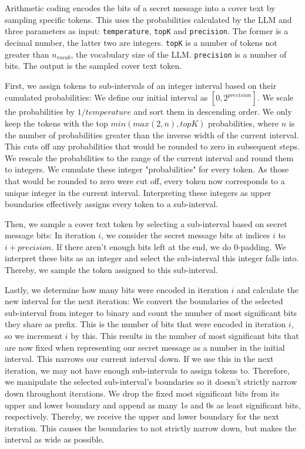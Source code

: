 Arithmetic coding encodes the bits of a secret message into a cover text by sampling specific tokens. This uses the probabilities calculated by the \gls{LLM} and three parameters as input: \lstinline|temperature|, \lstinline|topK| and \lstinline|precision|. The former is a decimal number, the latter two are integers. \lstinline|topK| is a number of tokens not greater than $ n_{vocab} $, the vocabulary size of the \gls{LLM}. \lstinline|precision| is a number of bits. The output is the sampled cover text token.

First, we assign tokens to sub-intervals of an integer interval based on their cumulated probabilities: We define our initial interval as $ [0, 2^{precision}] $. We scale the probabilities by $ 1/temperature $ and sort them in descending order. We only keep the tokens with the top $ min(max(2, n), topK) $ probabilities, where $ n $ is the number of probabilities greater than the inverse width of the current interval. This cuts off any probabilities that would be rounded to zero in subsequent steps. We rescale the probabilities to the range of the current interval and round them to integers. We cumulate these integer "probabilities" for every token. As those that would be rounded to zero were cut off, every token now corresponds to a unique integer in the current interval. Interpreting these integers as upper boundaries effectively assigns every token to a sub-interval.

Then, we sample a cover text token by selecting a sub-interval based on secret message bits: In iteration $ i $, we consider the secret message bits at indices $ i $ to $ i + precision $. If there aren't enough bits left at the end, we do 0-padding. We interpret these bits as an integer and select the sub-interval this integer falls into. Thereby, we sample the token assigned to this sub-interval.

Lastly, we determine how many bits were encoded in iteration $ i $ and calculate the new interval for the next iteration: We convert the boundaries of the selected sub-interval from integer to binary and count the number of most significant bits they share as prefix. This is the number of bits that were encoded in iteration $ i $, so we increment $ i $ by this. This results in the number of most significant bits that are now fixed when representing our secret message as a number in the initial interval. This narrows our current interval down. If we use this in the next iteration, we may not have enough sub-intervals to assign tokens to. Therefore, we manipulate the selected sub-interval's boundaries so it doesn't strictly narrow down throughout iterations. We drop the fixed most significant bits from its upper and lower boundary and append as many 1s and 0s as least significant bits, respectively. Thereby, we receive the upper and lower boundary for the next iteration. This causes the boundaries to not strictly narrow down, but makes the interval as wide as possible.

